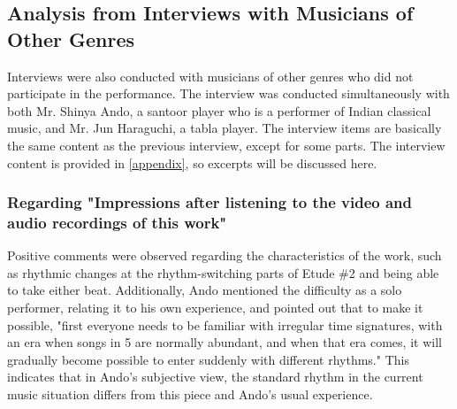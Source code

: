 \subsection{Analysis from Interviews with Musicians of Other Genres}

Interviews were also conducted with musicians of other genres who did not participate in the performance. The interview was conducted simultaneously with both Mr. Shinya Ando, a santoor player who is a performer of Indian classical music, and Mr. Jun Haraguchi, a tabla player. The interview items are basically the same content as the previous interview, except for some parts. The interview content is provided in \ref{appendix}, so excerpts will be discussed here.


\subsubsection{Regarding "Impressions after listening to the video and audio recordings of this work"}

Positive comments were observed regarding the characteristics of the work, such as rhythmic changes at the rhythm-switching parts of Etude \#2 and being able to take either beat. Additionally, Ando mentioned the difficulty as a solo performer, relating it to his own experience, and pointed out that to make it possible, "first everyone needs to be familiar with irregular time signatures, with an era when songs in 5 are normally abundant, and when that era comes, it will gradually become possible to enter suddenly with different rhythms." This indicates that in Ando's subjective view, the standard rhythm in the current music situation differs from this piece and Ando's usual experience.

